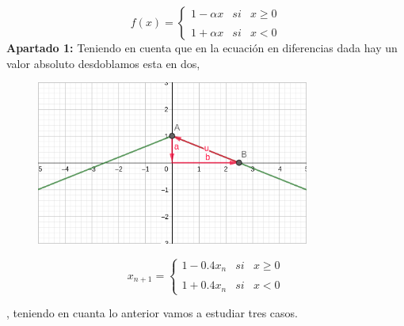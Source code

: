 \documentclass{article}
\begin{document}
\begin{equation*}
f(x)= \left\{ \begin{array}{lcc}
             1 -\alpha x &   si  & x \geq 0 \\
             \\ 1 + \alpha x &  si & x < 0
             \end{array}
   \right.
\end{equation*}
\textbf{Apartado 1:} Teniendo en cuenta que en la ecuación en diferencias dada hay un valor absoluto desdoblamos esta en dos,
\begin{figure}
\centering
\includegraphics[width=0.8\textwidth, scale=1]{grafica_apar1.png}
\end{figure}
\begin{equation*}
x_{n+1}= \left\{ \begin{array}{lcc}
             1 -0.4 x_n &   si  & x \geq 0 \\
             \\ 1 + 0.4 x_n &  si & x < 0
             \end{array}
   \right.
\end{equation*}

, teniendo en cuanta lo anterior vamos a estudiar tres casos.
\end{document}
